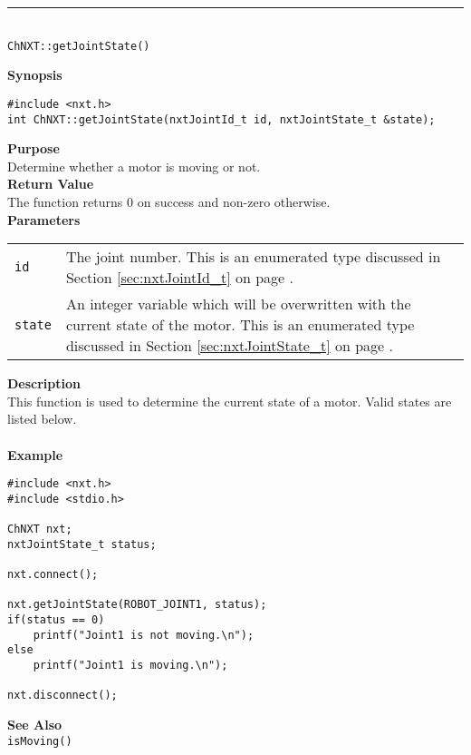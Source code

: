 \noindent
\vspace{5pt}
\rule{4.5in}{0.015in}\\
\noindent
{\LARGE \texttt{ChNXT::getJointState()}}\\
{}

\noindent
{\bf Synopsis}
\vspace{-8pt}
\begin{verbatim}
#include <nxt.h>
int ChNXT::getJointState(nxtJointId_t id, nxtJointState_t &state);
\end{verbatim}

\noindent
{\bf Purpose}\\
Determine whether a motor is moving or not.\\

\noindent
{\bf Return Value}\\
The function returns 0 on success and non-zero otherwise.\\

\noindent
{\bf Parameters}
\vspace{-0.1in}
\begin{description}
\item               
\begin{tabular}{p{10 mm}p{145 mm}}
\texttt{id} & The joint number. This is an enumerated type 
discussed in Section \ref{sec:nxtJointId_t} on page
\pageref{sec:nxtJointId_t}.\\
\texttt{state} & An integer variable which will be overwritten with the current state of the motor. 
This is an enumerated type 
discussed in Section \ref{sec:nxtJointState_t} on page
\pageref{sec:nxtJointState_t}.
\end{tabular}
\end{description}

\noindent
{\bf Description}\\
This function is used to determine the current state of a motor. Valid states are listed below.\\
\\


\noindent
{\bf Example}\\
\begin{verbatim}
#include <nxt.h>
#include <stdio.h>

ChNXT nxt;
nxtJointState_t status;

nxt.connect();

nxt.getJointState(ROBOT_JOINT1, status);
if(status == 0)
    printf("Joint1 is not moving.\n");
else
    printf("Joint1 is moving.\n");

nxt.disconnect();
\end{verbatim}

\noindent
{\bf See Also}\\
\texttt{isMoving()}\\
